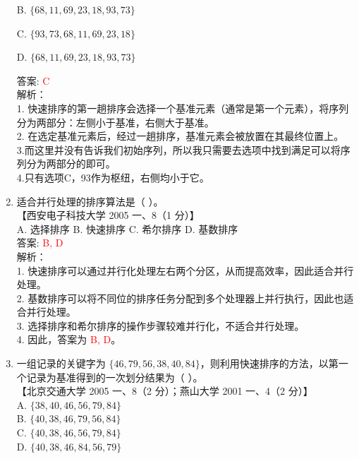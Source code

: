 \documentclass[lang=cn,newtx,10pt,scheme=chinese]{../../../elegantbook}
\begin{document}
\begin{enumerate}
    B. $\{68, 11, 69, 23, 18, 93, 73\}$ 

    C. $\{93, 73, 68, 11, 69, 23, 18\}$  

    D. $\{68, 11, 69, 23, 18, 93, 73\}$  

    答案: \textcolor{red}{C} \\
    解析：\\
    1. 快速排序的第一趟排序会选择一个基准元素（通常是第一个元素），将序列分为两部分：左侧小于基准，右侧大于基准。\\
    2. 在选定基准元素后，经过一趟排序，基准元素会被放置在其最终位置上。\\
    3.而这里并没有告诉我们初始序列，所以我只需要去选项中找到满足可以将序列分为两部分的即可。\\
    4.只有选项C，93作为枢纽，右侧均小于它。
    \item 适合并行处理的排序算法是（ ）。\\
    【西安电子科技大学 2005 一、8（1 分）】\\  

    A. 选择排序 \quad B. 快速排序 \quad C. 希尔排序 \quad D. 基数排序 \\

    答案: \textcolor{red}{B, D} \\

    解析：\\
    1. 快速排序可以通过并行化处理左右两个分区，从而提高效率，因此适合并行处理。\\
    2. 基数排序可以将不同位的排序任务分配到多个处理器上并行执行，因此也适合并行处理。\\
    3. 选择排序和希尔排序的操作步骤较难并行化，不适合并行处理。\\
    4. 因此，答案为 \textcolor{red}{B, D}。\\ 

    \item 一组记录的关键字为 $\{46, 79, 56, 38, 40, 84\}$，则利用快速排序的方法，以第一个记录为基准得到的一次划分结果为（ ）。\\
    【北京交通大学 2005 一、8（2 分）；燕山大学 2001 一、4（2 分）】 \\

    A. $\{38, 40, 46, 56, 79, 84\}$ \\  
    B. $\{40, 38, 46, 79, 56, 84\}$ \\  
    C. $\{40, 38, 46, 56, 79, 84\}$ \\  
    D. $\{40, 38, 46, 84, 56, 79\}$ \\


\end{enumerate}
\end{document}
